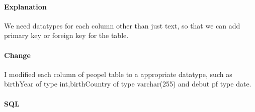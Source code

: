 \documentclass[11pt]{article}
\begin{document}
\hypertarget{explanation}{%
\paragraph{Explanation}\label{explanation}}

    We need datatypes for each column other than just text, so that we can
add primary key or foreign key for the table.

    \hypertarget{change}{%
\paragraph{Change}\label{change}}

    I modified each column of peopel table to a appropriate datatype, such
as birthYear of type int,birthCountry of type varchar(255) and debut pf
type date.

    \hypertarget{sql}{%
\paragraph{SQL}\label{sql}}
\end{document}
